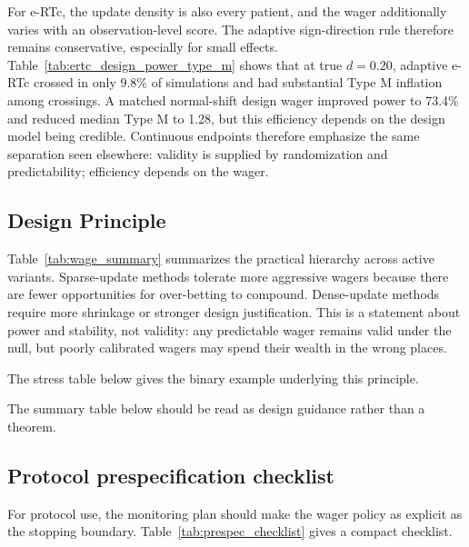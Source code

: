 \documentclass[10pt]{article}
\begin{document}
For e-RTc, the update density is also every patient, and the wager additionally varies with an observation-level score. The adaptive sign-direction rule therefore remains conservative, especially for small effects. Table~\ref{tab:ertc_design_power_type_m} shows that at true $d=0.20$, adaptive e-RTc crossed in only 9.8\% of simulations and had substantial Type M inflation among crossings. A matched normal-shift design wager improved power to 73.4\% and reduced median Type M to 1.28, but this efficiency depends on the design model being credible. Continuous endpoints therefore emphasize the same separation seen elsewhere: validity is supplied by randomization and predictability; efficiency depends on the wager.

\subsection{Design Principle}

Table~\ref{tab:wage_summary} summarizes the practical hierarchy across active variants. Sparse-update methods tolerate more aggressive wagers because there are fewer opportunities for over-betting to compound. Dense-update methods require more shrinkage or stronger design justification. This is a statement about power and stability, not validity: any predictable wager remains valid under the null, but poorly calibrated wagers may spend their wealth in the wrong places.

The stress table below gives the binary example underlying this principle.



The summary table below should be read as design guidance rather than a theorem.



\subsection{Protocol prespecification checklist}

For protocol use, the monitoring plan should make the wager policy as explicit as the stopping boundary. Table~\ref{tab:prespec_checklist} gives a compact checklist.
\end{document}
